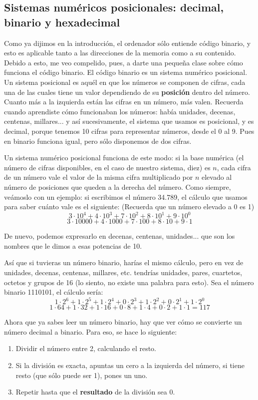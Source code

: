 \documentclass[a4paper]{article}
\begin{document}
\subsection{Sistemas numéricos posicionales: decimal, binario y hexadecimal}
\label{numericSystems}
Como ya dijimos en la introducción, el ordenador sólo entiende código binario,
y esto es aplicable tanto a las direcciones de la memoria como a su contenido.
Debido a esto, me veo compelido, pues, a
darte una pequeña clase sobre cómo funciona el código binario. El código binario
es un sistema numérico posicional. Un sistema posicional es aquél en que los
números se componen de cifras, cada una de las cuales tiene un valor dependiendo
de su \textbf{posición} dentro del número. Cuanto más a la izquierda están las
cifras en un número, más valen. Recuerda cuando aprendiste cómo funcionaban los
números: había unidades, decenas, centenas, millares... y así sucesivamente,
el sistema que usamos es posicional, y es decimal, porque tenemos 10 cifras para
representar números, desde el 0 al 9. Pues en binario funciona igual, pero sólo
disponemos de dos cifras.

Un sistema numérico posicional
funciona de este modo: si la base numérica (el número de cifras disponibles,
en el caso de nuestro sistema, diez) es $n$, cada cifra de un número vale
el valor de la misma cifra multiplicado por $n$ elevado al número de posiciones
que queden a la derecha del número. Como siempre, veámoslo con un ejemplo: si
escribimos el número 34.789, el cálculo que usamos para saber cuánto vale es
el siguiente:
(Recuerda que un número elevado a 0 es 1)
$$
3\cdot10^4+4\cdot10^3+7\cdot10^2+8\cdot10^1+9\cdot10^0
$$
$$
3\cdot10000+4\cdot1000+7\cdot100+8\cdot10+9\cdot1
$$

De nuevo, podemos expresarlo en decenas, centenas, unidades... que son los
nombres que le dimos a esas potencias de 10.

Así que si tuvieras un número binario, harías el mismo cálculo, pero
en vez de unidades, decenas, centenas, millares, etc. tendrías unidades, pares,
cuartetos, octetos y grupos de 16 (lo siento, no existe una palabra para esto).
Sea el número binario 1110101, el cálculo sería:
$$
1\cdot2^6+ 1\cdot2^5+1\cdot2^4+0\cdot2^3+1\cdot2^2+0\cdot2^1+1\cdot2^0
$$
$$
1\cdot64+ 1\cdot32+1\cdot16+0\cdot8+1\cdot4+0\cdot2+1\cdot1=117
$$

Ahora que ya sabes leer un número binario, hay que ver cómo se convierte un
número decimal a binario. Para eso, se hace lo siguiente:
\begin{enumerate}
\item Dividir el número entre 2, calculando el resto.
\item Si la división es exacta, apuntas un cero a la izquierda del número, si
tiene resto (que sólo puede ser 1), pones un uno.
\item Repetir hasta que el \textbf{resultado} de la división sea 0.
\end{enumerate}
\end{document}
